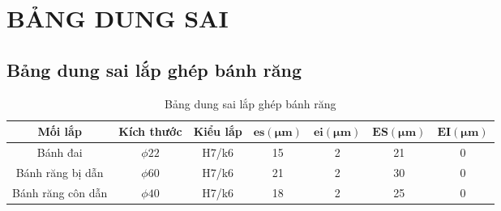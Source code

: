     \section{BẢNG DUNG SAI}
        \subsection{Bảng dung sai lắp ghép bánh răng}
            \begin{table}[H]
                \centering
                \begin{tabular}{|c|c|c|c|c|c|c|}
                    \hline
                    \textbf{Mối lắp} & \textbf{Kích thước} & \textbf{Kiểu lắp} & $\mathbf{es (\mu m)}$ & $\mathbf{ei (\mu m)}$ & $\mathbf{ES (\mu m)}$ & $\mathbf{EI (\mu m)}$\\
                    \hline
                    Bánh đai & $\phi 22$ & H7/k6 & 15 & 2 & 21 & 0 \\
                    \hline
                    Bánh răng bị dẫn & $\phi 60$ & H7/k6 & 21 & 2 & 30 & 0 \\
                    \hline
                    Bánh răng côn dẫn & $\phi 40$ & H7/k6 & 18 & 2 & 25 & 0 \\
                    \hline
                \end{tabular}
                \caption{Bảng dung sai lắp ghép bánh răng}
            \end{table}
